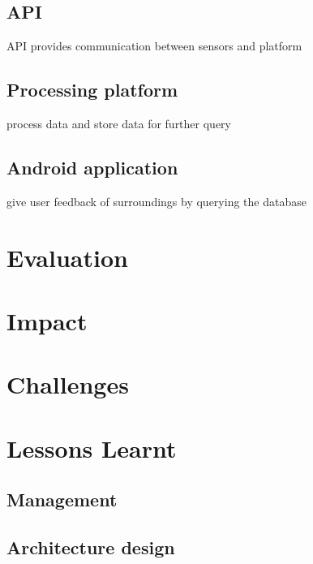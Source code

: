 \documentclass[prodmode,acmtosem]{acmsmall} %
\begin{document}
\subsection{API}
API provides communication between sensors and platform
\subsection{Processing platform}
process data and store data for further query
\subsection{Android application}
give user feedback of surroundings by querying the database
\section{Evaluation}
\section{Impact}
\section{Challenges}
\section{Lessons Learnt}
\subsection{Management}
\subsection{Architecture design}
\end{document}
